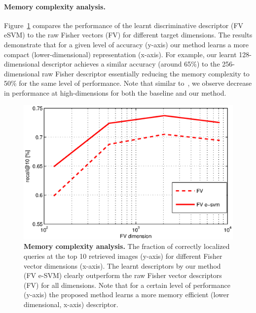 \documentclass[10pt,twocolumn,letterpaper]{article}
\begin{document}
      \paragraph{Memory complexity analysis.}
         Figure~\ref{fig:memory} compares the performance of the learnt discriminative descriptor (FV eSVM) to the raw Fisher vectors (FV) for different target dimensions. 
         The results demonstrate that for a given level of accuracy (y-axis) our method learns a more compact (lower-dimensional) representation (x-axis). For example, our learnt 128-dimensional descriptor achieves a similar accuracy (around 65\%) to the 256-dimensional raw Fisher descriptor essentially reducing the memory complexity to 50\% for the same level of performance.  Note that 
         similar to~\cite{Jegou12}, we observe decrease in performance at high-dimensions for both the baseline and our method.
         \begin{figure}[t!]
            \centering
            \includegraphics[trim = 7mm 0mm 12mm 6mm, clip=true, width=1.0\linewidth]{imgs/FVmemory}    
            \caption{
               \textbf{Memory complexity analysis.} 
               The fraction of correctly localized queries at the top 10 retrieved images (y-axis) for different Fisher vector dimensions (x-axis). The learnt descriptors by our method (FV e-SVM) clearly outperform the raw Fisher vector descriptors (FV) for all dimensions. Note that for a certain level of performance (y-axis) the proposed method learns a more memory efficient (lower dimensional, x-axis) descriptor.
            }
            \label{fig:memory}
         \end{figure}
\end{document}
